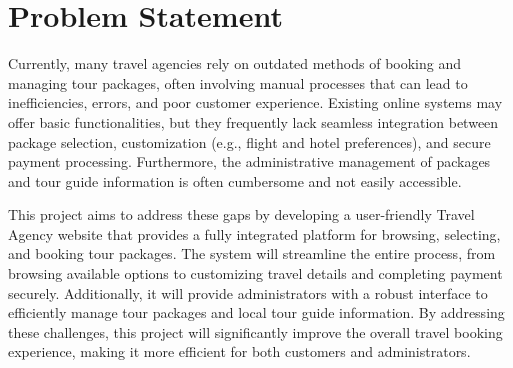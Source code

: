 \section{Problem Statement}
Currently, many travel agencies rely on outdated methods of booking and managing tour packages, often involving manual processes that can lead to inefficiencies, errors, and poor customer experience. Existing online systems may offer basic functionalities, but they frequently lack seamless integration between package selection, customization (e.g., flight and hotel preferences), and secure payment processing. Furthermore, the administrative management of packages and tour guide information is often cumbersome and not easily accessible.

This project aims to address these gaps by developing a user-friendly Travel Agency website that provides a fully integrated platform for browsing, selecting, and booking tour packages. The system will streamline the entire process, from browsing available options to customizing travel details and completing payment securely. Additionally, it will provide administrators with a robust interface to efficiently manage tour packages and local tour guide information. By addressing these challenges, this project will significantly improve the overall travel booking experience, making it more efficient for both customers and administrators.